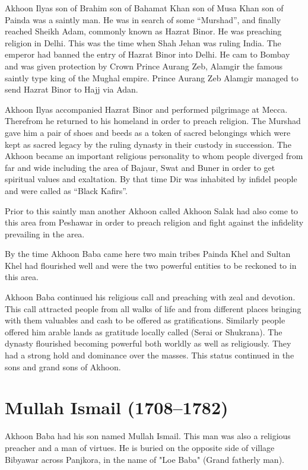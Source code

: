 \documentclass[twoside,openright]{book}
\begin{document}
Akhoon Ilyas son of Brahim son of Bahamat Khan son of Musa Khan son of Painda
was a saintly man. He was in search of some ``Murshad'', and finally reached
Sheikh Adam, commonly known as Hazrat Binor. He was preaching religion in Delhi.
This was the time when Shah Jehan was ruling India. The emperor had banned the
entry of Hazrat Binor into Delhi. He cam to Bombay and was given protection by
Crown Prince Aurang Zeb, Alamgir the famous saintly type king of the Mughal
empire. Prince Aurang Zeb Alamgir managed to send Hazrat Binor to Hajj via Adan.

Akhoon Ilyas accompanied Hazrat Binor and performed pilgrimage at Mecca.
Therefrom he returned to his homeland in order to preach religion. The Murshad
gave him a pair of shoes and beeds as a token of sacred belongings which were
kept as sacred legacy by the ruling dynasty in their custody in succession. The
Akhoon became an important religious personality to whom people diverged from
far and wide including the area of Bajaur, Swat and Buner in order to get
spiritual values and exaltation. By that time Dir was inhabited by infidel
people and were called as ``Black Kafirs''.

Prior to this saintly man another Akhoon called Akhoon Salak had also come to
this area from Peshawar in order to preach religion and fight against the
infidelity prevailing in the area.

By the time Akhoon Baba came here two main tribes Painda Khel and Sultan Khel
had flourished well and were the two powerful entities to be reckoned to in this
area.

Akhoon Baba continued his religious call and preaching with zeal and devotion.
This call attracted people from all walks of life and from different places
bringing with them valuables and cash to be offered as gratifications. Similarly
people offered him arable lands as gratitude locally called (Serai or Shukrana).
The dynasty flourished becoming powerful both worldly as well as religiously.
They had a strong hold and dominance over the masses. This status continued in
the sons and grand sons of Akhoon.

\section{Mullah Ismail (1708--1782)}

Akhoon Baba had his son named Mullah Ismail. This man was also a religious
preacher and a man of virtues. He is buried on the opposite side of village
Bibyawar across Panjkora, in the name of "Loe Baba" (Grand fatherly man).
\end{document}
